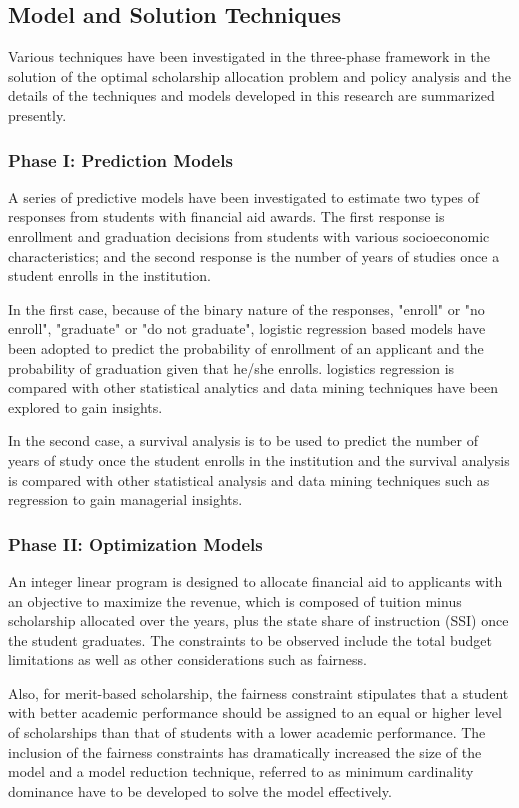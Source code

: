 \documentclass[12pt,english]{report}
\begin{document}
\subsection{Model and Solution Techniques}
Various techniques have been investigated in the three-phase framework in the
solution of the optimal scholarship allocation problem and policy analysis and
the details of the techniques and models developed in this research are
summarized presently.

\subsubsection{Phase I: Prediction Models}
A series of predictive models have been investigated to estimate two types of
responses from students with financial aid awards. The first response is
enrollment and graduation decisions from students with various socioeconomic
characteristics;  and the second response is the number of years of studies
once a student enrolls in the institution.

In the first case,  because of the binary nature of the responses,  "enroll" or
"no enroll",  "graduate" or "do not graduate", logistic regression based models
have been adopted to predict the probability of enrollment of an applicant and
the probability of graduation given that he/she enrolls.   logistics regression
is compared with other statistical analytics and data mining techniques have
been explored to gain insights.

In the second case, a survival analysis is to be used to predict the number of
years of study once the student enrolls in the institution and the survival
analysis is compared with other statistical analysis and data mining
techniques such as regression to gain managerial insights.

\subsubsection{Phase II: Optimization Models}
An integer linear program is designed to allocate financial aid to applicants
with an objective to maximize the revenue, which is composed of tuition minus
scholarship allocated over the years, plus the state share of instruction (SSI)
once the student graduates.  The constraints to be observed include the total
budget limitations as well as other considerations such as fairness.

Also, for merit-based scholarship, the fairness constraint stipulates
that a student with better academic performance should be assigned to an equal
or higher level of scholarships than that of students with a lower academic
performance. The inclusion of the fairness constraints has dramatically
increased the size of the model and a model reduction technique, referred to as
minimum cardinality dominance have to be developed to solve the model
effectively.
\end{document}
